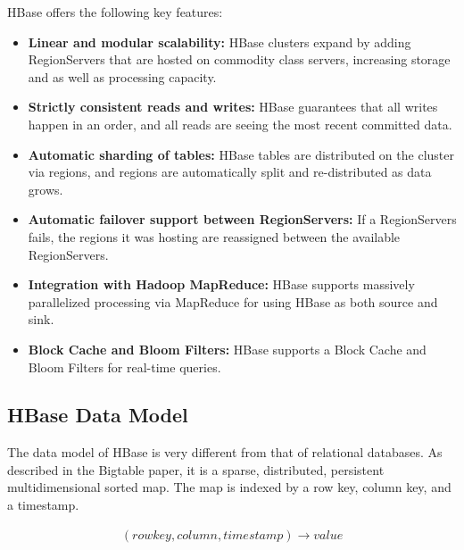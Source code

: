 HBase offers the following key features:
\begin{itemize}
\item \textbf{Linear and modular scalability:} HBase clusters expand by adding RegionServers that are hosted on commodity class servers, increasing storage and as well as processing capacity.
\item \textbf{Strictly consistent reads and writes:} HBase guarantees that all writes happen in an order, and all reads are seeing the most recent committed data.
\item \textbf{Automatic sharding of tables:} HBase tables are distributed on the cluster via regions, and regions are automatically split and re-distributed as data grows.
\item \textbf{Automatic failover support between RegionServers:} If a RegionServers fails, the regions it was hosting are reassigned between the available RegionServers.
\item \textbf{Integration with Hadoop MapReduce:} HBase supports massively parallelized processing via MapReduce for using HBase as both source and sink.
\item \textbf{Block Cache and Bloom Filters:} HBase supports a Block Cache and Bloom Filters for real-time queries.
\end{itemize}

\subsection{HBase Data Model}

The data model of HBase is very different from that of relational databases. As described in the  Bigtable paper, it is a sparse, distributed, persistent multidimensional sorted map. The map is indexed by a row key, column key, and a timestamp.

\begin{gather*}
(rowkey, column, timestamp) \rightarrow value
\end{gather*}

